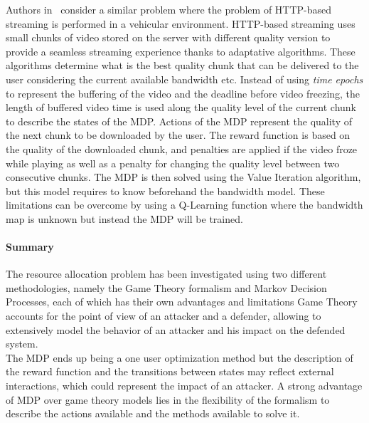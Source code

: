 Authors in~\cite{Bokani2015} consider a similar problem where the problem of HTTP-based streaming is performed in a vehicular environment.
HTTP-based streaming uses small chunks of video stored on the server with different quality version to provide a seamless streaming experience thanks to adaptative algorithms. 
These algorithms determine what is the best quality chunk that can be delivered to the user considering the current available bandwidth etc. Instead of using \textit{time epochs} to represent the buffering of the video and the deadline before video freezing, the length of buffered video time is used along the quality level of the current chunk to describe the states of the MDP. 
Actions of the MDP represent the quality of the next chunk to be downloaded by the user.
The reward function is based on the quality of the downloaded chunk, and penalties are applied if the video froze while playing as well as a penalty for changing the quality level between two consecutive chunks.
The MDP is then solved using the Value Iteration algorithm, but this model requires to know beforehand the bandwidth model. 
These limitations can be overcome by using a Q-Learning function where the bandwidth map is unknown but instead the MDP will be trained.

\paragraph{Summary}
The resource allocation problem has been investigated using two different methodologies, namely the Game Theory formalism and Markov Decision Processes, each of which has their own advantages and limitations
Game Theory accounts for the point of view of an attacker and a defender, allowing to extensively model the behavior of an attacker and his impact on the defended system.\\
The MDP ends up being a one user optimization method but the description of the reward function and the transitions between states may reflect external interactions, which could represent the impact of an attacker.
A strong advantage of MDP over game theory models lies in the flexibility of the formalism to describe the actions available and the methods available to solve it.


